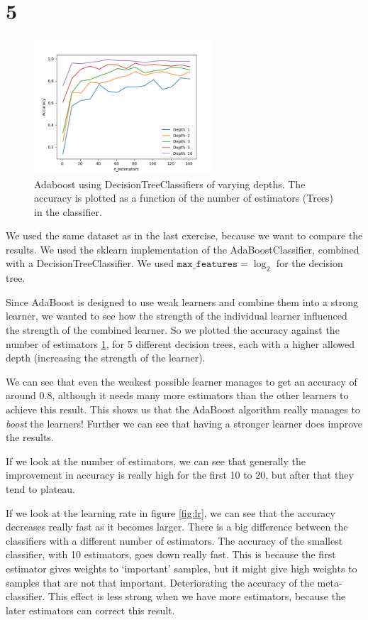 \documentclass[11pt]{article}
\begin{document}
\section*{5}

\begin{figure}[h]
	\centering
	\includegraphics[width=0.6\textwidth]{images/ex2_5_depth_estimators}
	\caption{Adaboost using DecisionTreeClassifiers of varying depths. The accuracy is plotted as a function of the number of estimators (Trees) in the classifier.}
	\label{fig:acc_vs_ests}
\end{figure}
We used the same dataset as in the last exercise, because we want to compare the results. We used the sklearn implementation of the AdaBoostClassifier, combined with a DecisionTreeClassifier.  We used  $\texttt{max\_features}=\log_2$ for the decision tree.

Since AdaBoost is designed to use weak learners and combine them into a strong learner, we wanted to see how the strength of the individual learner influenced the strength of the combined learner. So we plotted the accuracy against the number of estimators \ref{fig:acc_vs_ests}, for 5 different decision trees, each with a higher allowed depth (increasing the strength of the learner). 

We can see that even the weakest possible learner manages to get an accuracy of around 0.8, although it needs many more estimators than the other learners to achieve this result. This shows us that the AdaBoost algorithm really manages to \emph{boost} the learners! Further we can see that having a stronger learner does improve the results.

If we look at the number of estimators, we can see that generally the improvement in accuracy is really high for the first 10 to 20, but after that they tend to plateau.

If we look at the learning rate in figure \ref{fig:lr}, we can see that the accuracy decreases really fast as it becomes larger. There is a big difference between the classifiers with a different number of estimators. The accuracy of the smallest classifier, with 10 estimators, goes down really fast. This is because the first estimator gives weights to `important' samples, but it might give high weights to samples that are not that important. Deteriorating the accuracy of the meta-classifier.
This effect is less strong when we have more estimators, because the later estimators can correct this result.
\end{document}
